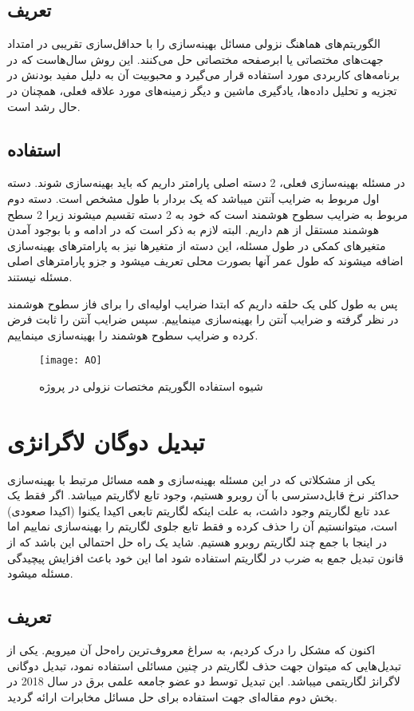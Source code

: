 \subsection{تعریف}
الگوریتم‌های هماهنگ نزولی مسائل بهینه‌سازی را با حداقل‌سازی تقریبی در امتداد جهت‌های مختصاتی یا ابرصفحه مختصاتی حل می‌کنند. این روش سال‌هاست که در برنامه‌های کاربردی مورد استفاده قرار می‌گیرد و محبوبیت آن‌ به دلیل مفید بودنش در تجزیه و تحلیل داده‌ها، یادگیری ماشین و دیگر زمینه‌های مورد علاقه فعلی، همچنان در حال رشد است.

\subsection{استفاده}
در مسئله بهینه‌سازی فعلی، 2 دسته اصلی پارامتر داریم که باید بهینه‌سازی شوند. دسته اول مربوط به ضرایب آنتن میباشد که یک بردار با طول مشخص است. دسته دوم مربوط به ضرایب سطوح هوشمند است که خود به 2 دسته تقسیم میشوند زیرا 2 سطح هوشمند مستقل از هم داریم. البته لازم به ذکر است که در ادامه و با بوجود آمدن متغیرهای کمکی در طول مسئله، این دسته از متغیرها نیز به پارامترهای بهینه‌سازی اضافه میشوند که طول عمر آنها بصورت محلی تعریف میشود و جزو پارامترهای اصلی مسئله نیستند.

پس به طول کلی یک حلقه داریم که ابتدا ضرایب اولیه‌ای را برای فاز سطوح هوشمند در نظر گرفته و ضرایب آنتن‌ را بهینه‌سازی مینماییم. سپس ضرایب آنتن را ثابت فرض کرده و ضرایب سطوح هوشمند را بهینه‌سازی مینماییم.
\begin{figure}[!h]
	\centering
	\texttt{[image: AO]}
	
	\caption[شیوه استفاده الگوریتم مختصات نزولی در پروژه]{
		شیوه استفاده الگوریتم مختصات نزولی در پروژه
	}
\end{figure}
\section{تبدیل دوگان لاگرانژی}
یکی از مشکلاتی که در این مسئله بهینه‌سازی و همه مسائل مرتبط با بهینه‌سازی حداکثر نرخ قابل‌دسترسی با آن روبرو هستیم، وجود تابع لاگاریتم میباشد. اگر فقط یک عدد تابع لگاریتم وجود داشت، به علت اینکه لگاریتم تابعی اکیدا یکنوا (اکیدا صعودی) است، میتوانستیم آن را حذف کرده و فقط تابع جلوی لگاریتم را بهینه‌سازی نماییم اما در اینجا با جمع چند لگاریتم روبرو هستیم. شاید یک راه حل احتمالی این باشد که از قانون تبدیل جمع به ضرب در لگاریتم استفاده شود اما این خود باعث افزایش پیچیدگی مسئله میشود. 
\subsection{تعریف}
اکنون که مشکل را درک کردیم، به سراغ معروف‌ترین راه‌حل آن میرویم. یکی از تبدیل‌هایی که میتوان جهت حذف لگاریتم در چنین مسائلی استفاده نمود، تبدیل دوگانی لاگرانژ لگاریتمی میباشد. 
این تبدیل توسط دو عضو جامعه علمی برق در سال 2018 در بخش دوم مقاله‌ای جهت استفاده برای حل مسائل مخابرات ارائه گردید.

